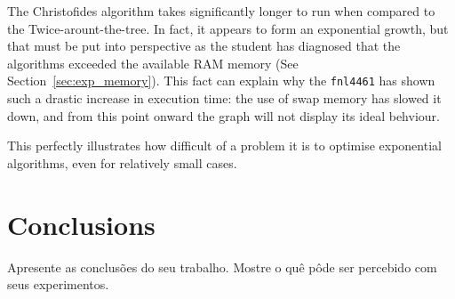 \documentclass[12pt]{article}
\begin{document}
The Christofides algorithm takes significantly longer to run when compared to the Twice-arount-the-tree. 
In fact, it appears to form an exponential growth, but that must be put into perspective as the student 
has diagnosed that the algorithms exceeded the available RAM memory (See Section~\ref{sec:exp_memory}). 
This fact can explain why the \texttt{fnl4461} has shown such a drastic increase in execution time: the use 
of swap memory has slowed it down, and from this point onward the graph will not display its ideal behviour.

This perfectly illustrates how difficult of a problem it is to optimise exponential algorithms, even for relatively 
small cases.

\section{Conclusions} \label{sec:conclusions}
    Apresente as conclusões do seu trabalho. Mostre o quê pôde ser percebido
    com seus experimentos.



\end{document}
